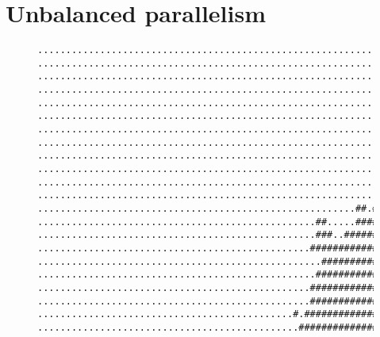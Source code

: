 \documentclass[mscres,cdtppar,twoside,openright,logo,rightchapter,normalheadings]{infthesis}
\theoremstyle{definition}
\begin{document}
\section{Unbalanced parallelism}
\begin{figure}
\centering
\begin{lstlisting}[style={},basicstyle=\ttfamily\tiny,breaklines=false,morekeywords={\#},keywordstyle={\color{blue}}]
....................................................................................................
....................................................................................................
.................................................................##.................................
.................................................................##.................................
...............................................................#####................................
..............................................................#######...............................
..............................................................#######...............................
.............................................................########...............................
..............................................................#######...............................
..............................................................#######...............................
..............................................................######................................
............................................................#....#.#................................
........................................................##.##############..#........................
.................................................##.....####################........................
.................................................###..########################...#.#................
................................................###############################.###.................
..................................................##################################................
.................................................##################################.................
................................................#################################...................
................................................##################################..................
.............................................#.####################################.................
..............................................######################################................

\end{lstlisting}
\end{figure}
\end{document}
